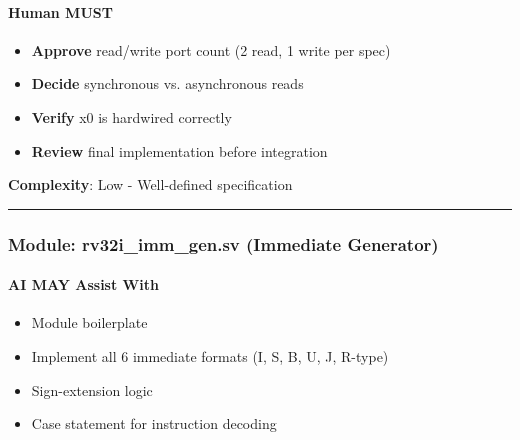 \paragraph{\texorpdfstring{\hold{} Human MUST}{ Human MUST}}\label{cr:status:phase1-ai-human-responsibilities:raised-hand-human-must}

\begin{record}

\begin{itemize}
\tightlist
\item
  \textbf{Approve} read/\allowbreak{}write port count (2 read, 1 write
  per spec)
\item
  \textbf{Decide} synchronous vs. asynchronous reads
\item
  \textbf{Verify} x0 is hardwired correctly
\item
  \textbf{Review} final implementation before integration
\end{itemize}

\textbf{Complexity}: \ok{} Low - Well-defined specification

\begin{center}\rule{0.5\linewidth}{0.5pt}\end{center}

\end{record}

\subsubsection{\texorpdfstring{Module:
rv32i\_\allowbreak{}imm\_\allowbreak{}gen.sv (Immediate
Generator)}{Module: rv32i\_imm\_gen.sv (Immediate Generator)}}\label{cr:status:phase1-ai-human-responsibilities:module-rv32i-imm-gensv-immediate-generator}

\paragraph{\texorpdfstring{\ok{} AI MAY Assist
With}{ AI MAY Assist With}}\label{cr:status:phase1-ai-human-responsibilities:white-check-mark-ai-may-assist-with-1}

\begin{record}

\begin{itemize}
\tightlist
\item
  Module boilerplate
\item
  Implement all 6 immediate formats (I, S, B, U, J, R-type)
\item
  Sign-extension logic
\item
  Case statement for instruction decoding
\end{itemize}

\end{record}

